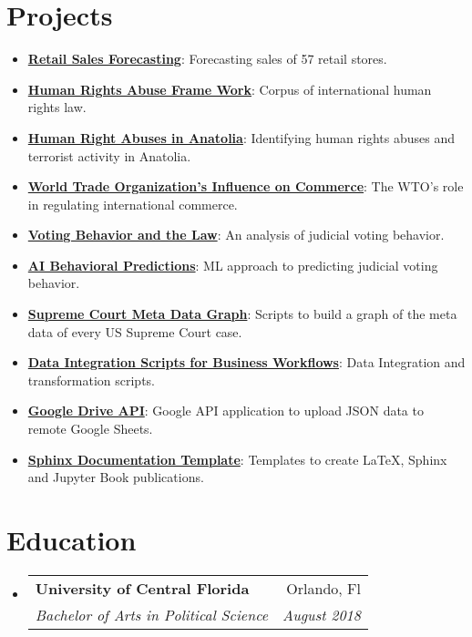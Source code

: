 \documentclass[letterpaper,11pt]{article}
\makeatletter
\newcommand{\resumeItem}[2]{
  \item\small{
    \textbf{#1}{: #2 \vspace{-2pt}}
  }
}
\newcommand{\resumeSubheading}[4]{
  \vspace{-1pt}\item
    \begin{tabular*}{0.97\textwidth}[t]{l@{\extracolsep{\fill}}r}
      \textbf{#1} & #2 \\
      \textit{\small#3} & \textit{\small #4} \\
    \end{tabular*}\vspace{-5pt}
}
\newcommand{\resumeSubItem}[2]{\resumeItem{#1}{#2}\vspace{-4pt}}
\newcommand{\resumeSubHeadingListStart}{\begin{itemize}[leftmargin=*]}
\newcommand{\resumeSubHeadingListEnd}{\end{itemize}}
\makeatother
\begin{document}
\section{Projects}
  \resumeSubHeadingListStart
    \resumeSubItem{\href{http://docs.jnapolitano.io/parts/analysis/business-analysis/project-retail-sales-forecasting/code-base/SalesForcasting.html}{Retail Sales Forecasting}}
      {Forecasting sales of 57 retail stores.}
    \resumeSubItem{\href{https://docs.jnapolitano.io/parts/analysis/political-analysis/human-rights-law/index.html}{Human Rights Abuse Frame Work}}
      {Corpus of international human rights law.}
    \resumeSubItem{\href{https://journal.jnapolitano.io/parts/articles/project-kurdish-conflict/index.html}{Human Right Abuses in Anatolia}}
      {Identifying human rights abuses and terrorist activity in Anatolia.}
    \resumeSubItem{\href{https://journal.jnapolitano.io/parts/articles/project-evolution-of-ngos/index.html}{World Trade Organization's Influence on Commerce}}
      {The WTO's role in regulating international commerce.}
    \resumeSubItem{\href{https://journal.jnapolitano.io/parts/articles/project-supcourt-masterpiececake/index.html}{Voting Behavior and the Law}}
      {An analysis of judicial voting behavior.}
    \resumeSubItem{\href{http://docs.jnapolitano.io/parts/analysis/political-analysis/sup-court/project-supcourt-tensorflow/index.html}{AI Behavioral Predictions}}
      {ML approach to predicting judicial voting behavior.}
    \resumeSubItem{\href{http://docs.jnapolitano.io/parts/analysis/political-analysis/sup-court/project-sup-court-meta-data-graph/index.html}{Supreme Court Meta Data Graph}}
      {Scripts to build a graph of the meta data of every US Supreme Court case.}
    \resumeSubItem{\href{https://docs.jnapolitano.io/parts/data/data-integration/index.html}{Data Integration Scripts for Business Workflows}}
      {Data Integration and transformation scripts.}
    \resumeSubItem{\href{https://docs.jnapolitano.io/parts/python-development/google/index.html}{Google Drive API}}
      {Google API application to upload JSON data to remote Google Sheets.}
    \resumeSubItem{\href{https://journal.jnapolitano.io/parts/tutorials/sphinx/docs/build-this-site.html}{Sphinx Documentation Template}}
      {Templates to create LaTeX, Sphinx and Jupyter Book publications.}
  \resumeSubHeadingListEnd

\section{Education}
\resumeSubHeadingListStart
  \resumeSubheading
    {University of Central Florida}{Orlando, Fl}
    {Bachelor of Arts in Political Science}{August 2018}
\resumeSubHeadingListEnd
\end{document}
